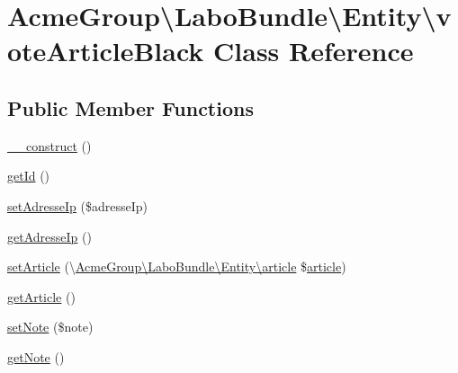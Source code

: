 \hypertarget{class_acme_group_1_1_labo_bundle_1_1_entity_1_1vote_article_black}{\section{Acme\+Group\textbackslash{}Labo\+Bundle\textbackslash{}Entity\textbackslash{}vote\+Article\+Black Class Reference}
\label{class_acme_group_1_1_labo_bundle_1_1_entity_1_1vote_article_black}
}
\subsection*{Public Member Functions}
\begin{DoxyCompactItemize}
\item 
\hyperlink{class_acme_group_1_1_labo_bundle_1_1_entity_1_1vote_article_black_a62646e483710998c4ecb402169b41481}{\+\_\+\+\_\+construct} ()
\item 
\hyperlink{class_acme_group_1_1_labo_bundle_1_1_entity_1_1vote_article_black_a002c2abca2d563d8aecf2753ec9f9db1}{get\+Id} ()
\item 
\hyperlink{class_acme_group_1_1_labo_bundle_1_1_entity_1_1vote_article_black_a7d4c059ecba34aae42bb68ce8ab22500}{set\+Adresse\+Ip} (\$adresse\+Ip)
\item 
\hyperlink{class_acme_group_1_1_labo_bundle_1_1_entity_1_1vote_article_black_a5e168d510f37f71f9b6fb7c2030fb267}{get\+Adresse\+Ip} ()
\item 
\hyperlink{class_acme_group_1_1_labo_bundle_1_1_entity_1_1vote_article_black_a07b511e2439f82870bbc3097b78e07e6}{set\+Article} (\textbackslash{}\hyperlink{class_acme_group_1_1_labo_bundle_1_1_entity_1_1article}{Acme\+Group\textbackslash{}\+Labo\+Bundle\textbackslash{}\+Entity\textbackslash{}article} \$\hyperlink{class_acme_group_1_1_labo_bundle_1_1_entity_1_1article}{article})
\item 
\hyperlink{class_acme_group_1_1_labo_bundle_1_1_entity_1_1vote_article_black_a25498c4f50a75689f283c892ecbc9358}{get\+Article} ()
\item 
\hyperlink{class_acme_group_1_1_labo_bundle_1_1_entity_1_1vote_article_black_a35d7710609cffda808ab4fa6cf127e7e}{set\+Note} (\$note)
\item 
\hyperlink{class_acme_group_1_1_labo_bundle_1_1_entity_1_1vote_article_black_ab9a0088dc11a4a1bcfee0e1a5d23364b}{get\+Note} ()

\end{DoxyCompactItemize}
